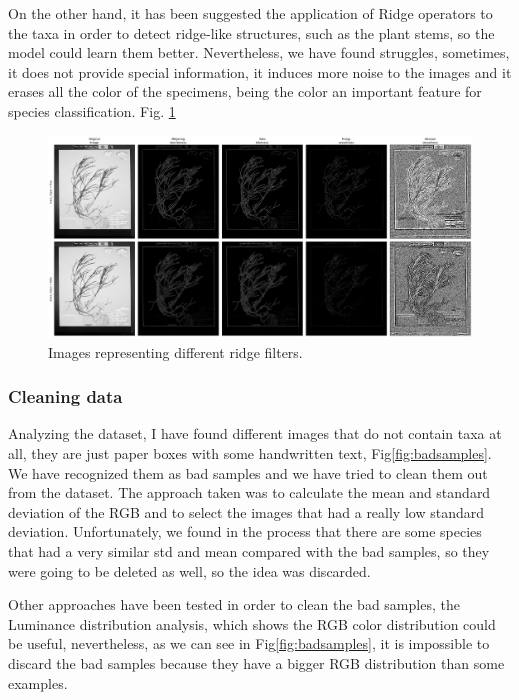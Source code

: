 \documentclass{article}
\begin{document}
On the other hand, it has been suggested the application of Ridge operators to the taxa in order to detect ridge-like structures, such as the plant stems, so the model could learn them better. Nevertheless, we have found struggles, sometimes, it does not provide special information, it induces more noise to the images and it erases all the color of the specimens, being the color an important feature for species classification. Fig. \ref{fig:ridge}

\begin{figure}[h]
    \centering
    \includegraphics[width=12cm]{ridgeop}
    \caption{Images representing different ridge filters.}
    \label{fig:ridge}
\end{figure}

\subsubsection{Cleaning data}
Analyzing the dataset, I have found different images that do not contain taxa at all, they are just paper boxes with some handwritten text, Fig\ref{fig:badsamples}. We have recognized them as bad samples and we have tried to clean them out from the dataset. The approach taken was to calculate the mean and standard deviation of the RGB and to select the images that had a really low standard deviation. Unfortunately, we found in the process that there are some species that had a very similar std and mean compared with the bad samples, so they were going to be deleted as well, so the idea was discarded.

Other approaches have been tested in order to clean the bad samples, the Luminance distribution analysis, which shows the RGB color distribution could be useful, nevertheless, as we can see in Fig\ref{fig:badsamples}, it is impossible to discard the bad samples because they have a bigger RGB distribution than some examples.
\end{document}
